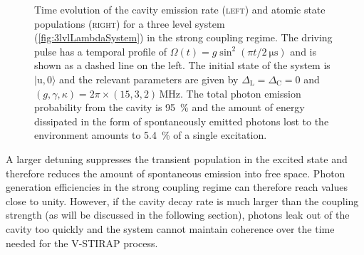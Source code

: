 \documentclass[../Thesis-IJspeert.tex]{subfiles}
\begin{document}
\begin{figure}[!t]
	\caption[Time evolution of a three-level atom-cavity system in the strong coupling regime]{Time evolution of the cavity emission rate \textsc{(left)} and atomic state populations \textsc{(right)} for a three level system (\autoref{fig:3lvlLambdaSystem}) in the strong coupling regime. The driving pulse has a temporal profile of $\Omega(t)=g\sin^2(\pi t/\SI{2}{\micro\second})$ and is shown as a dashed line on the left. The initial state of the system is $\vert \mathrm{u}, 0 \rangle$ and the relevant parameters are given by $\Delta_\mathrm{L}=\Delta_\mathrm{C}=0$ and $(g,\gamma,\kappa)=2\pi\times(15,3,2)\,\si{\mega\hertz}$. The total photon emission probability from the cavity is \SI{95}{\percent} and the amount of energy dissipated in the form of spontaneously emitted photons lost to the environment amounts to \SI{5.4}{\percent} of a single excitation.}
	\label{fig:StrongCoupling} 
\end{figure}
A larger detuning suppresses the transient population in the excited state and therefore reduces the amount of spontaneous emission into free space. Photon generation efficiencies in the strong coupling regime can therefore reach values close to unity. However, if the cavity decay rate is much larger than the coupling strength (as will be discussed in the following section), photons leak out of the cavity too quickly and the system cannot maintain coherence over the time needed for the V-STIRAP process.
\end{document}

